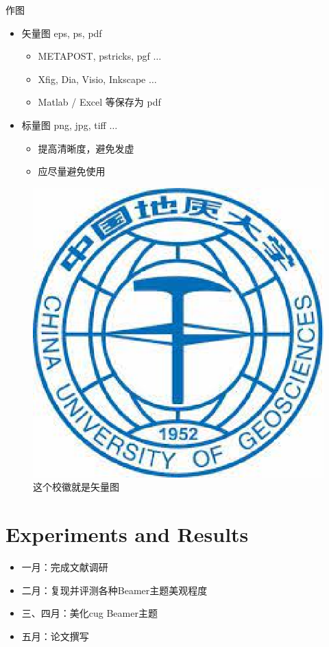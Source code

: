 \documentclass{beamer}
\begin{document}
\begin{frame}{作图}
    \begin{itemize}
        \item 矢量图 eps, ps, pdf
        \begin{itemize}
            \item METAPOST, pstricks, pgf $\ldots$
            \item Xfig, Dia, Visio, Inkscape $\ldots$
            \item Matlab / Excel 等保存为 pdf
        \end{itemize}
        \item 标量图 png, jpg, tiff $\ldots$
        \begin{itemize}
            \item 提高清晰度，避免发虚
            \item 应尽量避免使用
        \end{itemize}
    \end{itemize}
    \begin{figure}[htpb]
        \centering
        \includegraphics[width=0.2\linewidth]{pic/cug_logo.eps}
        \caption{这个校徽就是矢量图}
    \end{figure}
\end{frame}

\section{Experiments and Results}
\begin{frame}
    \begin{itemize}
        \item 一月：完成文献调研
        \item 二月：复现并评测各种Beamer主题美观程度
        \item 三、四月：美化cug Beamer主题
        \item 五月：论文撰写
    \end{itemize}
\end{frame}

\end{document}
